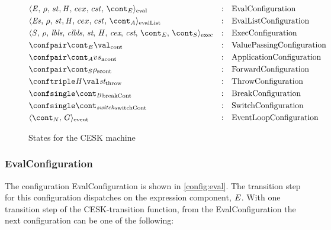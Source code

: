 \documentclass[a4paper,oneside,fleqn]{article}
\begin{document}
\begin{figure}[Htp]
  \begin{eqfigure}
  \begin{align}
    &\evalconf{\expr}{\env}{st}{cex}{cst}{\econt} & :\quad & \text{EvalConfiguration} \label{config:eval}\\
    &\evallistconf{\exprs}{\env}{st}{cex}{cst}{\acont} & :\quad & \text{EvalListConfiguration} \label{config:evallist}\\
    &\execconf{\stmt}{\env}{\lbls}{\clbls}{\strace}{\handler}{\cex,\,\cstrace}{\econt}{\scont}  & :\quad & \text{ExecConfiguration} \label{config:exec}\\
    &\contconf{\econt}{\val} & :\quad & \text{ValuePassingConfiguration} \label{config:econt}\\
    &\acontconf{\acont}{\vals} & :\quad & \text{ApplicationConfiguration} \label{config:acont}\\
    &\scontconf{\scont}{\env} & :\quad & \text{ForwardConfiguration} \label{config:scont}\\
    &\throwconf{\handler}{\val}{\strace} & :\quad & \text{ThrowConfiguration} \label{config:throw}\\
    &\breakconf{\bcont} & :\quad & \text{BreakConfiguration} \label{config:bcont}\\
    &\switchconf{\switchcont} & :\quad & \text{SwitchConfiguration} \\
    &\eventconf{\ncont}{\eventloop} & :\quad & \text{EventLoopConfiguration}
    \label{config:switchcont}
  \end{align}
  \caption{States for the CESK machine}
  \end{eqfigure}
\end{figure}


\subsubsection{EvalConfiguration}
\label{subsubsec:evalconfig}

The configuration EvalConfiguration is shown in \ref{config:eval}.
The transition step for this configuration dispatches on the expression component, $\mathit{E}$.
With one transition step of the CESK-transition function, from the EvalConfiguration the next configuration can be one of the following:
\end{document}
